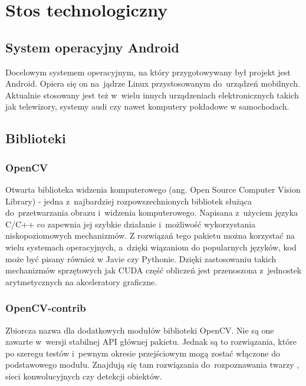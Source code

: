 \newpage

\section{Stos technologiczny} \label{section:tech_stack}

\subsection{System operacyjny Android}

Docelowym systemem operacyjnym, na który przygotowywany był projekt jest Android. Opiera się on na~jądrze Linux przystosowanym do~urządzeń mobilnych. Aktualnie stosowany jest też w~wielu innych urządzeniach elektronicznych takich jak telewizory, systemy audi czy nawet komputery pokładowe w samochodach.  

\subsection{Biblioteki}

\subsubsection{OpenCV}

Otwarta biblioteka widzenia komputerowego (ang. Open Source Computer Vision Library) \cite{opencv} - jedna z~najbardziej rozpowszechnionych bibliotek służąca do~przetwarzania obrazu i~widzenia komputerowego. Napisana z~użyciem języka C/C++ co zapewnia jej szybkie działanie i~możliwość wykorzystania niskopoziomowych mechanizmów. Z rozwiązań tego pakietu można korzystać na wielu systemach operacyjnych, a~dzięki wiązaniom do popularnych języków, kod może być pisany również w Javie czy Pythonie. Dzięki zastosowaniu takich mechanizmów sprzętowych jak CUDA \cite{nvidia_cuda} część obliczeń jest przenoszona z~jednostek arytmetycznych na akceleratory graficzne.


\subsubsection{OpenCV-contrib} \label{section:opencv_contrib}

Zbiorcza nazwa dla dodatkowych modułów \cite{opencv_contrib} biblioteki OpenCV. Nie są one zawarte w~wersji stabilnej API głównej pakietu. Jednak są to rozwiązania, które po szeregu testów i~pewnym okresie przejściowym mogą zostać włączone do podstawowego modułu. Znajdują się tam rozwiązania do~rozpoznawania twarzy \cite{opencvcontribface}, sieci konwolucyjnych czy detekcji obiektów. 

